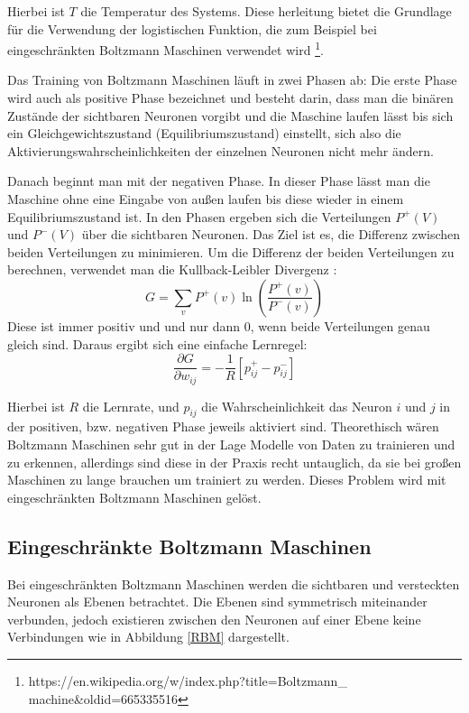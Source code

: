 \documentclass[12pt]{article}
\begin{document}
Hierbei ist $T$ die Temperatur des Systems. Diese herleitung bietet die Grundlage für die Verwendung der logistischen Funktion, die zum Beispiel bei eingeschränkten Boltzmann Maschinen verwendet wird \footnote{https://en.wikipedia.org/w/index.php?title=Boltzmann\_ machine\&oldid=665335516}. 

Das Training von Boltzmann Maschinen läuft in zwei Phasen ab: Die erste Phase wird auch als positive Phase bezeichnet und besteht darin, dass man die binären Zustände der sichtbaren Neuronen vorgibt und die Maschine laufen lässt bis sich ein Gleichgewichtszustand (Equilibriumszustand) einstellt, sich also die Aktivierungswahrscheinlichkeiten der einzelnen Neuronen nicht mehr ändern. 

Danach beginnt man mit der negativen Phase. In dieser Phase lässt man die Maschine ohne eine Eingabe von außen laufen bis diese wieder in einem Equilibriumszustand ist. In den Phasen ergeben sich die Verteilungen $P^+(V)$ und $P^-(V)$ über die sichtbaren Neuronen. Das Ziel ist es, die Differenz zwischen beiden Verteilungen zu minimieren. Um die Differenz der beiden Verteilungen zu berechnen, verwendet man die Kullback-Leibler Divergenz \cite{KLD}:
\begin{equation}
G = \sum_{v}{P^{+}(v)\ln\left({\frac{P^{+}(v)}{P^{-}(v)}}\right)}
\end{equation} 
Diese ist immer positiv und und nur dann 0, wenn beide Verteilungen genau gleich sind. Daraus ergibt sich eine einfache Lernregel:
\begin{equation}
\frac{\partial{G}}{\partial{w_{ij}}} = -\frac{1}{R}[p_{ij}^{+}-p_{ij}^{-}]
\end{equation}

Hierbei ist $R$ die Lernrate, und $p_{ij}$ die Wahrscheinlichkeit das Neuron $i$ und $j$ in der positiven, bzw. negativen Phase jeweils aktiviert sind.
Theorethisch wären Boltzmann Maschinen sehr gut in der Lage Modelle von Daten zu trainieren und zu erkennen, allerdings sind diese in der Praxis recht untauglich, da sie bei großen Maschinen zu lange brauchen um trainiert zu werden. Dieses Problem wird mit eingeschränkten Boltzmann Maschinen gelöst.

\subsection{Eingeschränkte Boltzmann Maschinen}	
Bei eingeschränkten Boltzmann Maschinen werden die sichtbaren und versteckten Neuronen als Ebenen betrachtet. Die Ebenen sind symmetrisch miteinander verbunden, jedoch existieren zwischen den Neuronen auf einer Ebene keine Verbindungen wie in Abbildung \ref{RBM} dargestellt.
\end{document}
